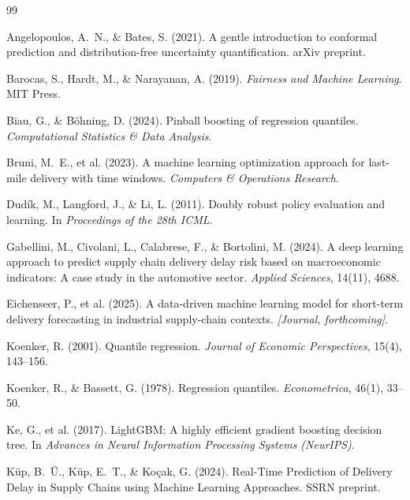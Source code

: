 \documentclass[12pt]{article}
\begin{document}
\begin{thebibliography}{99}

Angelopoulos, A.~N., \& Bates, S. (2021).
A gentle introduction to conformal prediction and distribution-free uncertainty quantification.
arXiv preprint.

Barocas, S., Hardt, M., \& Narayanan, A. (2019).
\emph{Fairness and Machine Learning}.
MIT Press.

Biau, G., \& Böhning, D. (2024).
Pinball boosting of regression quantiles.
\emph{Computational Statistics \& Data Analysis}.

Bruni, M.~E., et al. (2023).
A machine learning optimization approach for last-mile delivery with time windows.
\emph{Computers \& Operations Research}.

Dudík, M., Langford, J., \& Li, L. (2011).
Doubly robust policy evaluation and learning.
In \emph{Proceedings of the 28th ICML}.

Gabellini, M., Civolani, L., Calabrese, F., \& Bortolini, M. (2024).
A deep learning approach to predict supply chain delivery delay risk based on macroeconomic indicators: A case study in the automotive sector.
\emph{Applied Sciences}, 14(11), 4688.

Eichenseer, P., et al. (2025).
A data-driven machine learning model for short-term delivery forecasting in industrial supply-chain contexts.
\emph{[Journal, forthcoming]}.

Koenker, R. (2001).
Quantile regression.
\emph{Journal of Economic Perspectives}, 15(4), 143–156.

Koenker, R., \& Bassett, G. (1978).
Regression quantiles.
\emph{Econometrica}, 46(1), 33–50.

Ke, G., et al. (2017).
LightGBM: A highly efficient gradient boosting decision tree.
In \emph{Advances in Neural Information Processing Systems (NeurIPS)}.

Küp, B.~Ü., Küp, E.~T., \& Koçak, G. (2024).
Real-Time Prediction of Delivery Delay in Supply Chains using Machine Learning Approaches.
SSRN preprint.


\end{thebibliography}
\end{document}

